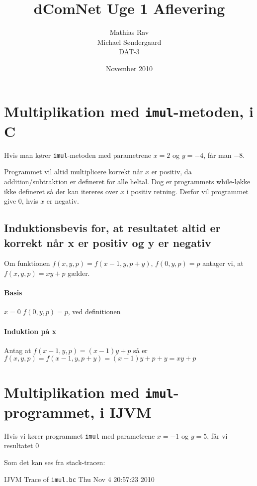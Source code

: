 \documentclass[12pt,a4paper]{article}
\newcommand{\imul}{\texttt{imul}}
\begin{document}
\title{dComNet Uge 1 Aflevering}
\author{Mathias Rav \\
		Michael Søndergaard \\
		DAT-3}
\date{November 2010}
\maketitle

\section{Multiplikation med \imul{}-metoden, i C}
Hvis man kører \imul{}-metoden med parametrene $x=2$ og $y=-4$, får man $-8$.

Programmet vil altid multiplicere korrekt når $x$ er positiv, da addition/subtraktion er defineret for alle heltal.
Dog er programmets while-løkke ikke defineret så der kan itereres over $x$ i positiv retning.
Derfor vil programmet give 0, hvis $x$ er negativ.

\subsection{Induktionsbevis for, at resultatet altid er korrekt når x er positiv og y er negativ}

Om funktionen $f(x, y, p) = f(x-1, y, p+y)$, $f(0, y, p) = p$ antager vi, at $f(x, y, p) = xy+p$ gælder.
\paragraph{Basis} $x = 0$
$f(0, y, p) = p$, ved definitionen
\paragraph{Induktion på x}
Antag at $f(x-1, y, p) = (x-1)y+p$
så er $f(x, y, p) = f(x-1, y, p+y) = (x-1)y+p+y = xy+p$



\section{Multiplikation med \imul{}-programmet, i IJVM}
Hvis vi kører programmet \imul{} med parametrene $x=-1$ og $y=5$, får vi resultatet $0$

Som det kan ses fra stack-tracen:

IJVM Trace of \texttt{imul.bc} Thu Nov  4 20:57:23 2010
\end{document}

